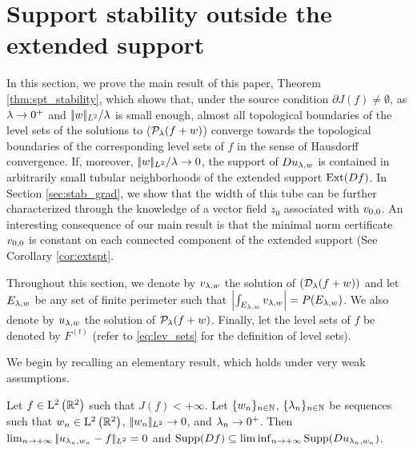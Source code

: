 


\section{Support stability outside the extended support}\label{sec:stab_extended_spt}



In this section, we  prove the main result of this paper, Theorem \ref{thm:spt_stability}, which shows that, under the source condition $\partial J(f)\neq \emptyset$, as $\lambda\to 0^+$ and $|\!| w |\!|_{L^2}/\lambda$ is small enough, almost all topological boundaries of the level sets of the solutions to ($\mathcal{P}_\lambda(f+w)$) converge towards the topological boundaries of the corresponding  level sets of $f$ in the sense of Hausdorff convergence. If,  moreover, $|\!| w |\!|_{L^2}/\lambda\to 0$, the support of $Du_{\lambda,w}$ is contained in arbitrarily small tubular neighborhoods of the extended support $\operatorname{Ext}(Df)$. 
In Section \ref{sec:stab_grad}, we show that the width of this tube can be further characterized through the knowledge of a vector field $z_0$ associated with $v_{0,0}$. An interesting consequence of our main result is that the minimal norm certificate $v_{0,0}$ is constant on each connected component of the extended support (See Corollary \ref{cor:extspt}.

Throughout this section, we denote by $v_{\lambda,w}$ the solution of $(\mathcal{D}_\lambda(f+w))$ and let $E_{\lambda,w}$ be any set of finite perimeter such that $\left| \int_{E_{\lambda,w}} v_{\lambda,w}  \right| = P(E_{\lambda,w})$. We also denote by $u_{\lambda,w}$ the solution of $\mathcal{P}_\lambda(f+w)$. Finally, let the level sets of $f$ be denoted by $F^{(t)}$ (refer to \eqref{eq:lev_sets} for the definition of level sets).

We begin by recalling an elementary result, which holds under very weak assumptions.


\begin{prop}\label{prop:l2cv}
  Let $f\in \mathrm{L}^2\left(\mathbb{R}^2\right)$ such that $J(f)<+\infty$. Let $\{w_n\}_{n\in\mathbb{N}}$, $\{\lambda_n\}_{n\in\mathbb{N}}$ be sequences such that $w_n\in \mathrm{L}^2\left(\mathbb{R}^2\right)$, $|\!| w_n |\!|_{L^2}\to 0$, and $\lambda_n\to 0^+$.
  Then $\lim_{n\to+\infty}|\!| u_{\lambda_n,w_n}-f |\!|_{L^2}=0$ and $\operatorname{Supp}(Df)\subseteq \liminf_{n\to +\infty} \operatorname{Supp}(Du_{\lambda_n,w_n})$. 
\end{prop}

